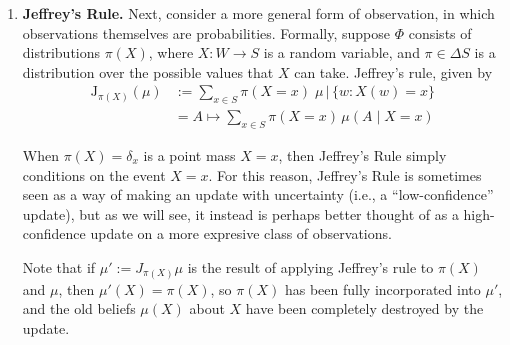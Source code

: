 \documentclass{article}
\begin{document}
\begin{enumerate}
	\item \textbf{Jeffrey's Rule.}
	Next, consider a more general form of observation, in which observations themselves are probabilities. 
	Formally, suppose $\Phi$ consists of distributions $\pi(X)$,
	where $X : W \to S$ is a random variable,
	and $\pi \in \Delta S$ is a distribution over the possible values that $X$ can take.
	Jeffrey's rule, given by
	\begin{align*}
		\mathrm{J}_{\pi(X)}
		(\mu) &:= \sum_{x \in S} \pi(X\!=x) \;  \mu \,\Big|\, \{ w : X(w) = x \}
			\\
			&= A \mapsto \sum_{x \in S} \pi(X\!=x)\, \mu( A \mid X \!= x)
	\end{align*}

	When $\pi(X) = \delta_x$ is a point mass $X=x$, then Jeffrey's Rule simply conditions on the event $X = x$.
	For this reason, Jeffrey's Rule is sometimes seen as a way of making an update with uncertainty (i.e., a ``low-confidence'' update), but as we will see, it instead is perhaps better thought of as a high-confidence update on a more expresive class of observations.
	
	Note that if $\mu' := J_{\pi(X)}\mu$ is the result of applying Jeffrey's rule to $\pi(X)$ and $\mu$, 
	then $\mu'(X) = \pi(X)$, so $\pi(X)$ has been fully incorporated into $\mu'$, and the old beliefs $\mu(X)$ about $X$ have been completely destroyed by the update.
\end{enumerate}
\end{document}
